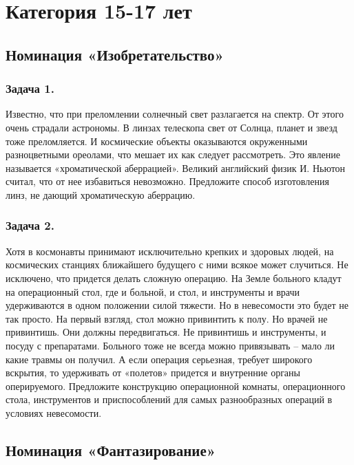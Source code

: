 \documentclass[11pt,a4paper]{article}
\begin{document}
\GeneralText
\clearpage

\section{Категория 15-17 лет}

\subsection{Номинация «Изобретательство»}

\newcommand{\Aberration}{Известно, что при преломлении солнечный свет
  разлагается на спектр. От этого очень страдали астрономы. В линзах телескопа
  свет от Солнца, планет и звезд тоже преломляется. И космические объекты
  оказываются окруженными разноцветными ореолами, что мешает их как следует
  рассмотреть. Это явление называется «хроматической аберрацией». Великий
  английский физик И. Ньютон считал, что от нее избавиться невозможно.
  Предложите способ изготовления линз, не дающий хроматическую аберрацию.}

\newcommand{\CosmicOperation}{Хотя в космонавты принимают исключительно
  крепких и здоровых людей, на космических станциях ближайшего будущего с ними
  всякое может случиться. Не исключено, что придется делать сложную
  операцию. На Земле больного кладут на операционный стол, где и больной, и
  стол, и инструменты и врачи удерживаются в одном положении силой тяжести. Но
  в невесомости это будет не так просто. На первый взгляд, стол можно
  привинтить к полу. Но врачей не привинтишь. Они должны передвигаться. Не
  привинтишь и инструменты, и посуду с препаратами. Больного тоже не всегда
  можно привязывать – мало ли какие травмы он получил. А если операция
  серьезная, требует широкого вскрытия, то удерживать от «полетов» придется и
  внутренние органы оперируемого. Предложите конструкцию операционной комнаты,
  операционного стола, инструментов и приспособлений для самых разнообразных
  операций в условиях невесомости.}

\subsubsection*{Задача 1.}\Aberration
\subsubsection*{Задача 2.}\CosmicOperation

\subsection{Номинация «Фантазирование»}
\end{document}
